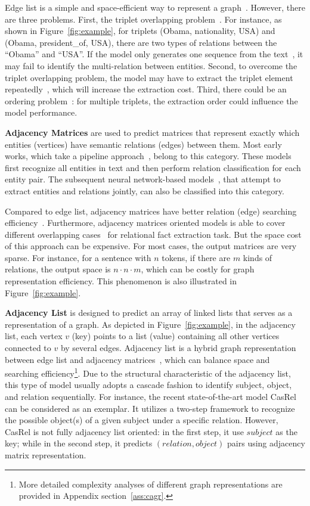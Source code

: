 \documentclass[11pt,a4paper]{article}
\begin{document}
Edge list is a simple and space-efficient way to represent a graph~\cite{arifuzzaman2015fast}. However, there are three problems. First, the triplet overlapping problem~\cite{zeng2018extracting}. For instance, as shown in Figure~\ref{fig:example}, for triplets (Obama, nationality, USA) and (Obama, president\_of, USA), there are two types of relations between the ``Obama'' and ``USA''. If the model only generates one sequence from the text~\cite{zheng2017joint}, it may fail to identify the multi-relation between entities. Second, to overcome the triplet overlapping problem, the model may have to extract the triplet element repeatedly~\cite{zeng2018extracting}, which will increase the extraction cost. Third, there could be an ordering problem~\cite{zeng2019learning}: for multiple triplets, the extraction order could influence the model performance.

\textbf{Adjacency Matrices} are used to predict matrices that represent exactly which entities (vertices) have semantic relations (edges) between them. Most early works, which take a pipeline approach~\cite{zelenko2003kernel,zhou2005exploring}, belong to this category. These models first recognize all entities in text and then perform relation classification for each entity pair. The subsequent neural network-based models~\cite{bekoulis2018joint,dai2019joint}, that attempt to extract entities and relations jointly, can also be classified into this category. 

Compared to edge list, adjacency matrices have better relation (edge) searching efficiency~\cite{arifuzzaman2015fast}. Furthermore, adjacency matrices oriented models is able to cover different overlapping cases~\cite{zeng2018extracting} for relational fact extraction task. But the space cost of this approach can be expensive. For most cases, the output matrices are very sparse. For instance, for a sentence with $n$ tokens, if there are $m$ kinds of relations, the output space is $n \cdot n \cdot m$, which can be costly for graph representation efficiency. This phenomenon is also illustrated in Figure~\ref{fig:example}.

\textbf{Adjacency List} is designed to predict  
an array of linked lists that serves as a representation of a graph. As depicted in Figure~\ref{fig:example}, in the adjacency list, each vertex $v$ (key) points to a list (value) containing all other vertices connected to $v$ by several edges. Adjacency list is a hybrid graph representation between edge list and adjacency matrices~\cite{gross2005graph}, which can balance space and searching efficiency\footnote{More detailed complexity analyses of different graph representations are provided in Appendix section~\ref{ass:cagr}.}. Due to the structural characteristic of the adjacency list, this type of model usually adopts a cascade fashion to identify subject, object, and relation sequentially. For instance, the recent state-of-the-art model CasRel~\cite{wei2020novel} can be considered as an exemplar. It utilizes a two-step framework to recognize the possible object(s) of a given subject under a specific relation. However, CasRel is not fully adjacency list oriented: in the first step, it use $subject$ as the key; while in the second step, it predicts $(relation, object)$ pairs using adjacency matrix representation.
\end{document}
